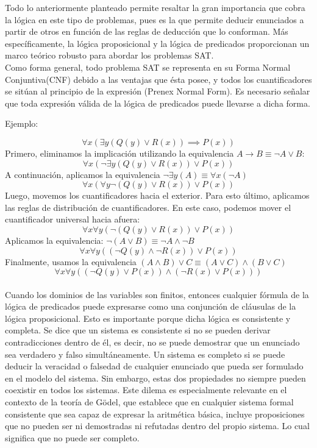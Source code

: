 \documentclass[runningheads]{llncs}
\begin{document}
Todo lo anteriormente planteado permite resaltar la gran importancia que cobra la lógica en este tipo de problemas, pues es la que permite deducir enunciados a partir de otros en función de las reglas de deducción que lo conforman. Más específicamente, la lógica proposicional y la lógica de predicados proporcionan un marco teórico robusto para abordar los problemas SAT.\\

Como forma general, todo problema SAT se representa en su Forma Normal Conjuntiva(CNF) debido a las ventajas que ésta posee, y todos los cuantificadores se sitúan al principio de la expresión (Prenex Normal Form). Es necesario señalar que toda expresión válida de la lógica de predicados puede llevarse a dicha forma.

Ejemplo:

$$\forall x(\exists y(Q(y)\lor R(x))\implies P(x))$$
Primero, eliminamos la implicación utilizando la equivalencia $A→B\equiv \neg A\lor B$:
$$\forall x(\neg\exists y(Q(y)\lor R(x)) \lor  P(x))$$
A continuación, aplicamos la equivalencia $\neg\exists y(A)\equiv \forall x(\neg A)$
$$\forall x(\forall y\neg(Q(y)\lor R(x)) \lor  P(x))$$
Luego, movemos los cuantificadores hacia el exterior. Para esto último, aplicamos las reglas de distribución de cuantificadores. En este caso, podemos mover el cuantificador universal hacia afuera:
$$\forall x\forall y(\neg(Q(y)\lor R(x))\lor  P(x))$$
Aplicamos la equivalencia: $\neg(A\lor B)\equiv \neg A\land\neg B$
$$\forall x\forall y((\neg Q(y)\land\neg R(x))\lor  P(x))$$
Finalmente, usamos la equivalencia $(A\land B)\lor C\equiv (A\lor C)\land(B\lor C)$
$$\forall x\forall y((\neg Q(y)\lor  P(x))\land(\neg R(x)\lor  P(x)))$$\\

Cuando los dominios de las variables son finitos, entonces cualquier fórmula de la lógica de predicados puede expresarse como una conjunción de cláusulas de la lógica proposicional. Esto es importante porque dicha lógica es consistente y completa. Se dice que un sistema es consistente si no se pueden derivar contradicciones dentro de él, es decir, no se puede demostrar que un enunciado sea verdadero y falso simultáneamente. Un sistema es completo si se puede deducir la veracidad o falsedad de cualquier enunciado que pueda ser formulado en el modelo del sistema. Sin embargo, estas dos propiedades no siempre pueden coexistir en todos los sistemas. Este dilema es especialmente relevante en el contexto de la teoría de Gödel, que establece que en cualquier sistema formal consistente que sea capaz de expresar la aritmética básica, incluye proposiciones que no pueden ser ni demostradas ni refutadas dentro del propio sistema. Lo cual significa que no puede ser completo.\\
\end{document}
